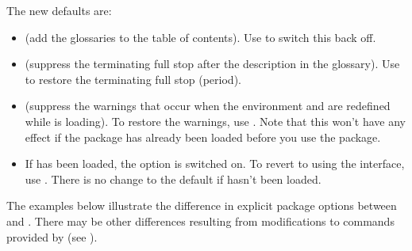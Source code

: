 \documentclass[report,inlinetitle,widecs]{nlctdoc}
\begin{document}
The new defaults are:
\begin{itemize}
\item {} (add the glossaries to the table of
contents). Use  to switch this back off.

\item {} (suppress the terminating full stop
after the description in the glossary). Use
 to restore the terminating full stop
(period).

\item {} (suppress the warnings that occur when
the  environment and  are redefined while
 is loading). To restore the warnings, use
. Note that this won't have any effect if
the  package has already been loaded before you use
the  package.

\item If  has been loaded, the 
option is switched on. To revert to using the 
interface, use . There is no change to the
default if  hasn't been loaded.

\end{itemize}

The examples below illustrate the difference in explicit
package options between  and
. There may be other differences
resulting from modifications to commands provided by
 (see ).
\end{document}
